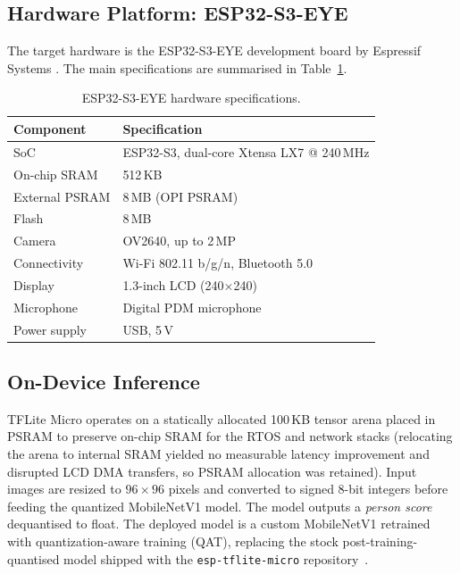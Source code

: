 \documentclass[conference]{IEEEtran}
\begin{document}
\subsection{Hardware Platform: ESP32-S3-EYE}

The target hardware is the ESP32-S3-EYE development board by Espressif
Systems \cite{esp32s3eye}. The main specifications are summarised in
Table~\ref{tab:hw}.

\begin{table}[h]
\centering
\caption{ESP32-S3-EYE hardware specifications.}
\label{tab:hw}
\begin{tabular}{ll}
\hline
\textbf{Component} & \textbf{Specification} \\
\hline
SoC            & ESP32-S3, dual-core Xtensa LX7 @ 240\,MHz \\
On-chip SRAM   & 512\,KB \\
External PSRAM & 8\,MB (OPI PSRAM) \\
Flash          & 8\,MB \\
Camera         & OV2640, up to 2\,MP \\
Connectivity   & Wi-Fi 802.11 b/g/n, Bluetooth 5.0 \\
Display        & 1.3-inch LCD (240$\times$240) \\
Microphone     & Digital PDM microphone \\
Power supply   & USB, 5\,V \\
\hline
\end{tabular}
\end{table}


\subsection{On-Device Inference}

TFLite Micro \cite{tflitemicro} operates on a statically allocated
100\,KB tensor arena placed in PSRAM to preserve on-chip SRAM for the
RTOS and network stacks (relocating the arena to internal SRAM yielded
no measurable latency improvement and disrupted LCD DMA transfers,
so PSRAM allocation was retained). Input images are resized to $96\!\times\!96$
pixels and converted to signed 8-bit integers before feeding the
quantized MobileNetV1 model. The model outputs a \emph{person score}
dequantised to float. The deployed model is a custom MobileNetV1
retrained with quantization-aware training (QAT), replacing the
stock post-training-quantised model shipped with the
\texttt{esp-tflite-micro} repository~\cite{esptflitemicro}.
\end{document}
